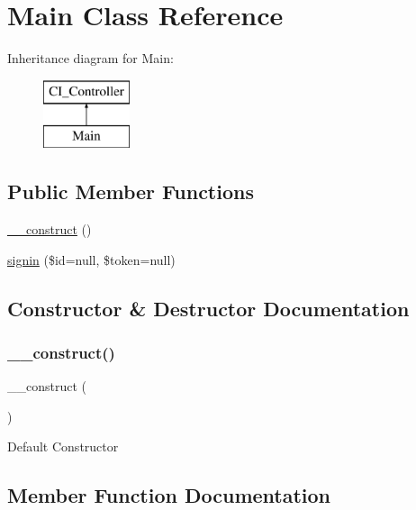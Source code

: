 \hypertarget{class_main}{}\section{Main Class Reference}
\label{class_main}
Inheritance diagram for Main\+:\begin{figure}[H]
\begin{center}
\leavevmode
\includegraphics[height=2.000000cm]{class_main}
\end{center}
\end{figure}
\subsection*{Public Member Functions}
\begin{DoxyCompactItemize}
\item 
\mbox{\hyperlink{class_main_a095c5d389db211932136b53f25f39685}{\+\_\+\+\_\+construct}} ()
\item 
\mbox{\hyperlink{class_main_a581fc1016bc76cba4fad0fc9a9f3f9cd}{signin}} (\$id=null, \$token=null)
\end{DoxyCompactItemize}


\subsection{Constructor \& Destructor Documentation}
\mbox{\label{class_main_a095c5d389db211932136b53f25f39685}} 
\subsubsection{\texorpdfstring{\+\_\+\+\_\+construct()}{\_\_construct()}}
{\footnotesize\ttfamily \+\_\+\+\_\+construct (\begin{DoxyParamCaption}{ }\end{DoxyParamCaption})}

Default Constructor 

\subsection{Member Function Documentation}
\mbox{\label{class_main_a581fc1016bc76cba4fad0fc9a9f3f9cd}} 
